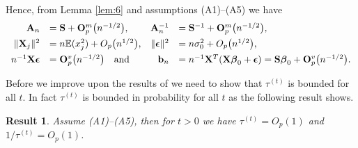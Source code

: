 \documentclass[11pt]{article}
\newtheorem{Result}{Result}
\newtheorem{Main Result}{Main Result}
\def\vectorfontone{\bf}
\def\vectorfonttwo{\boldsymbol}
\def\vb{{\vectorfontone b}}                      %
\def\vx{{\vectorfontone x}}                      %
\def\vbeta{{\vectorfonttwo \beta}}               %
\def\vepsilon{{\vectorfonttwo \epsilon}}         %
\def\matrixfontone{\bf}
\def\mA{{\matrixfontone A}}                      %
\def\mM{{\matrixfontone M}}                      %
\def\mO{{\matrixfontone O}}                      %
\def\mS{{\matrixfontone S}}                      %
\def\mX{{\matrixfontone X}}                      %
\def\bE{{\mathbb E}}                             %
\begin{document}
\noindent Hence, from Lemma \ref{lem:6} and assumptions (A1)--(A5) we have
\begin{equation}\label{eq:Xlimits}
\begin{array}{rlrl}
\mA_n &= \mS + \mO^m_p\big(n^{-1/2}\big),
&\mA_n^{-1} &= \mS^{-1} + \mO^m_p\big(n^{-1/2}\big),\\ [1ex]
\|\mX_j\|^2 &= n\bE(x_j^2) + O_p\big(n^{1/2}\big),
& \|\vepsilon\|^2 &= n\sigma_0^2 + O_p\big(n^{1/2}\big),\\ [1ex]
n^{-1}\mX\vepsilon &= \mO_p^v\big(n^{-1/2}\big)\quad \mbox{and}
& \vb_n&=n^{-1}\mX^{T}(\mX\vbeta_0+\vepsilon) = \mS\vbeta_0 + \mO_p^v\big(n^{-1/2}\big).
\end{array}
\end{equation}


\noindent Before we improve upon the results of \cite{You2014} we need to show that $\tau^{(t)}$ is bounded for all $t$. In fact $\tau^{(t)}$ is bounded in
probability for all $t$ as the following result shows.

\begin{Result}\label{res:6}
	Assume (A1)--(A5), then for $t>0$ we have
	$\tau^{(t)} = O_p(1)$ and $1/\tau^{(t)} = O_p(1)$.
\end{Result}
\end{document}
